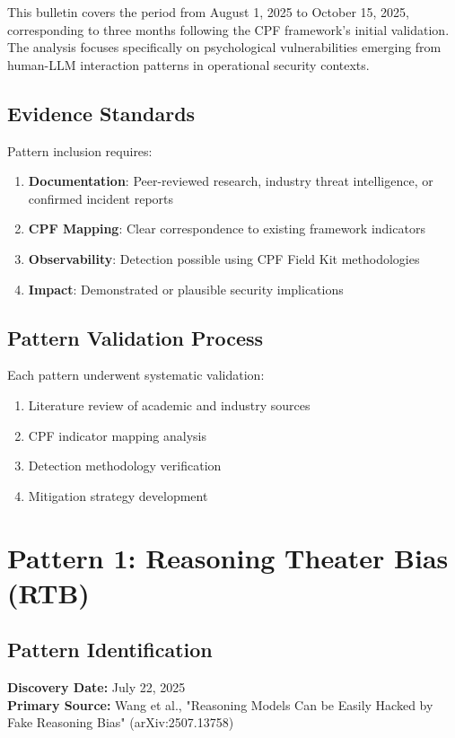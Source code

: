 \documentclass[11pt,a4paper]{article}
\begin{document}
This bulletin covers the period from August 1, 2025 to October 15, 2025, corresponding to three months following the CPF framework's initial validation. The analysis focuses specifically on psychological vulnerabilities emerging from human-LLM interaction patterns in operational security contexts.

\subsection{Evidence Standards}

Pattern inclusion requires:
\begin{enumerate}
\item \textbf{Documentation}: Peer-reviewed research, industry threat intelligence, or confirmed incident reports
\item \textbf{CPF Mapping}: Clear correspondence to existing framework indicators
\item \textbf{Observability}: Detection possible using CPF Field Kit methodologies
\item \textbf{Impact}: Demonstrated or plausible security implications
\end{enumerate}

\subsection{Pattern Validation Process}

Each pattern underwent systematic validation:
\begin{enumerate}
\item Literature review of academic and industry sources
\item CPF indicator mapping analysis
\item Detection methodology verification
\item Mitigation strategy development
\end{enumerate}

\section{Pattern 1: Reasoning Theater Bias (RTB)}

\subsection{Pattern Identification}

\textbf{Discovery Date:} July 22, 2025\\
\textbf{Primary Source:} Wang et al., "Reasoning Models Can be Easily Hacked by Fake Reasoning Bias" (arXiv:2507.13758)\cite{wang2025theater}
\end{document}
